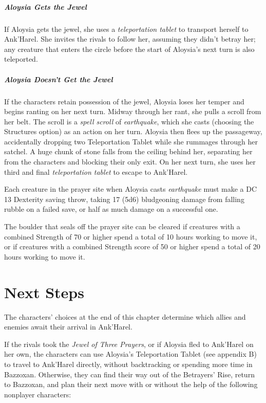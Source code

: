\documentclass[10pt,a4paper,twoside,fancy,bg=print,twocolumn,openany,nodeprecatedcode]{dndbook}
\begin{document}
\subparagraph{Aloysia Gets the Jewel}
If Aloysia gets the jewel, she uses a \textit{teleportation tablet} to transport herself to Ank'Harel. She invites the rivals to follow her, assuming they didn't betray her; any creature that enters the circle before the start of Aloysia's next turn is also teleported.

\subparagraph{Aloysia Doesn't Get the Jewel}
If the characters retain possession of the jewel, Aloysia loses her temper and begins ranting on her next turn. Midway through her rant, she pulls a scroll from her belt. The scroll is a \textit{spell scroll} of \textit{earthquake}, which she casts (choosing the Structures option) as an action on her turn. Aloysia then flees up the passageway, accidentally dropping two Teleportation Tablet while she rummages through her satchel. A huge chunk of stone falls from the ceiling behind her, separating her from the characters and blocking their only exit. On her next turn, she uses her third and final \textit{teleportation tablet} to escape to Ank'Harel.

Each creature in the prayer site when Aloysia casts \textit{earthquake} must make a DC 13 Dexterity saving throw, taking 17 (5d6) bludgeoning damage from falling rubble on a failed save, or half as much damage on a successful one.

The boulder that seals off the prayer site can be cleared if creatures with a combined Strength of 70 or higher spend a total of 10 hours working to move it, or if creatures with a combined Strength score of 50 or higher spend a total of 20 hours working to move it.

\section{Next Steps}
The characters' choices at the end of this chapter determine which allies and enemies await their arrival in Ank'Harel.

If the rivals took the \textit{Jewel of Three Prayers}, or if Aloysia fled to Ank'Harel on her own, the characters can use Aloysia's Teleportation Tablet (see appendix B) to travel to Ank'Harel directly, without backtracking or spending more time in Bazzoxan. Otherwise, they can find their way out of the Betrayers' Rise, return to Bazzoxan, and plan their next move with or without the help of the following nonplayer characters:
\end{document}
